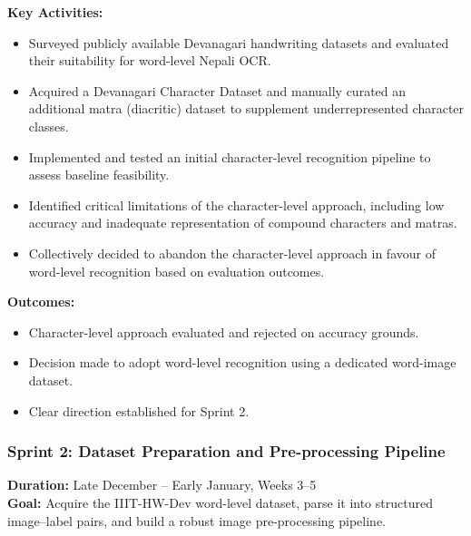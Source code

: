 \textbf{Key Activities:}
\begin{itemize}
    \item Surveyed publicly available Devanagari handwriting datasets and evaluated their suitability for word-level Nepali OCR.
    \item Acquired a Devanagari Character Dataset and manually curated 
    an additional matra (diacritic) dataset to supplement 
    underrepresented character classes.
    \item Implemented and tested an initial character-level recognition 
    pipeline to assess baseline feasibility.
    \item Identified critical limitations of the character-level 
    approach, including low accuracy and inadequate representation 
    of compound characters and matras.
    \item Collectively decided to abandon the character-level approach 
    in favour of word-level recognition based on evaluation outcomes.
\end{itemize}

\textbf{Outcomes:}
\begin{itemize}
    \item Character-level approach evaluated and rejected on accuracy 
    grounds.
    \item Decision made to adopt word-level recognition using a 
    dedicated word-image dataset.
    \item Clear direction established for Sprint 2.
\end{itemize}

\subsubsection{Sprint 2: Dataset Preparation and Pre-processing 
Pipeline}
\textbf{Duration:} Late December -- Early January, Weeks 3--5\\
\textbf{Goal:} Acquire the IIIT-HW-Dev word-level dataset, parse it 
into structured image--label pairs, and build a robust image 
pre-processing pipeline.

